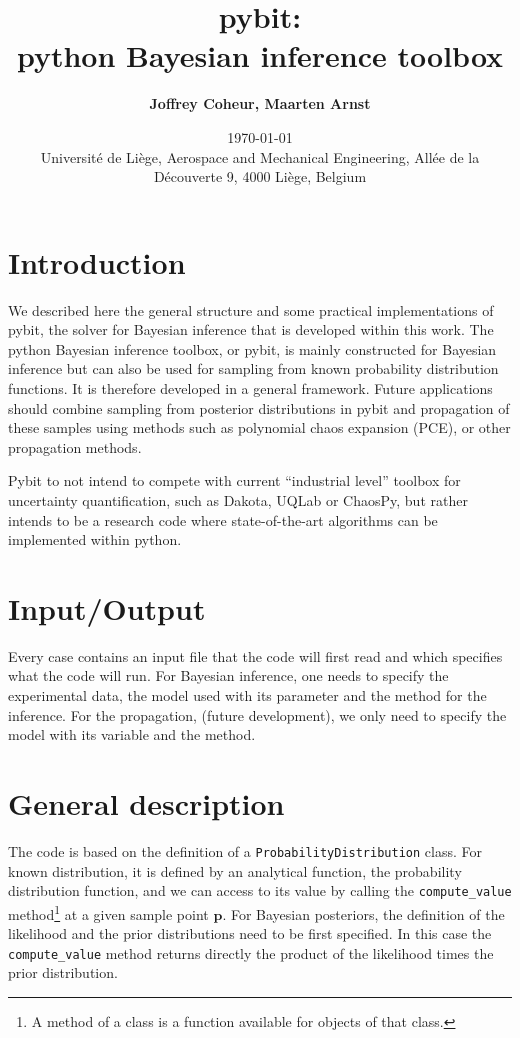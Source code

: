 \documentclass[a4paper,11pt]{article}
\title{\huge \textbf{pybit: \\ python Bayesian inference toolbox}}
\author{\textbf{Joffrey Coheur, Maarten Arnst}}
\date{\today \\ 
\vspace{50pt}
Universit\'e de Li\`ege, Aerospace and Mechanical Engineering, All\'ee de la D\'ecouverte 9, 4000 Li\`ege, Belgium}
\begin{document}
\begin{titlepage}
\maketitle
\end{titlepage}

\section{Introduction} 

We described here the general structure and some practical implementations of pybit, the solver for Bayesian inference that is developed within this work. The python Bayesian inference toolbox, or pybit, is mainly constructed for Bayesian inference but can also be used for sampling from known probability distribution functions. It is therefore developed in a general framework. Future applications should combine sampling from posterior distributions in pybit and propagation of these samples using methods such as polynomial chaos expansion (PCE), or other propagation methods. 

Pybit to not intend to compete with current ``industrial level'' toolbox for uncertainty quantification, such as Dakota, UQLab or ChaosPy, but rather intends to be a research code where state-of-the-art algorithms can be implemented within python.




 

\section{Input/Output} 

Every case contains an input file that the code will first read and which specifies what the code will run. For Bayesian inference, one needs to specify the experimental data, the model used with its parameter and the method for the inference. For the propagation, (future development), we only need to specify the model with its variable and the method. 


\section{General description} 

The code is based on the definition of a \texttt{ProbabilityDistribution} class. For known distribution, it is defined by an analytical function, the probability distribution function, and we can access to its value by calling the \texttt{compute\_value} method\footnote{A method of a class is a function available for objects of that class.} at a given sample point $\textbf{p}$. For Bayesian posteriors, the definition of the likelihood and the prior distributions need to be first specified. In this case the \texttt{compute\_value} method returns directly the product of the likelihood times the prior distribution. 
\end{document}
